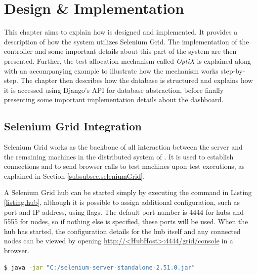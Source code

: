 \section{Design \& Implementation}\label{chapter.implementation}
\thispagestyle{plain}


This chapter aims to explain how \toolname \space is designed and implemented.  It  provides a description of how the system utilizes Selenium Grid. The implementation of the controller and some important details about this part of the system are then presented. Further, the test allocation mechanism called \emph{OptiX} is explained along with an accompanying example to illustrate how the mechanism works step-by-step. The chapter then describes how the database is structured and explains how it is accessed using Django's API for database abstraction, before finally presenting some important implementation details about the dashboard.

\subsection{Selenium Grid Integration}\label{section.selenium}

Selenium Grid works as the backbone of all interaction between the server and the remaining machines in the distributed system of \toolname. It is used to establish connections and to send browser calls to test machines upon test executions, as explained in Section \ref{subsubsec.seleniumGrid}.

A Selenium Grid hub can be started simply by executing the command in Listing \ref{listing.hub}, although it is possible to assign additional configuration, such as port and IP address, using flags. The default port number is 4444 for hubs and 5555 for nodes, so if nothing else is specified, these ports will be used. When the hub has started, the configuration details for the hub itself and any connected nodes can be viewed by opening \url{http://<HubHost>:4444/grid/console} in a browser.

\vspace{4mm}
\noindent\begin{minipage}{\textwidth}
\begin{lstlisting}[caption=Sample Shell Command for Starting Selenium Grid Hub, label={listing.hub}, language=bash,   stringstyle={}]
$ java -jar "C:/selenium-server-standalone-2.51.0.jar"
\end{lstlisting}
\end{minipage}

